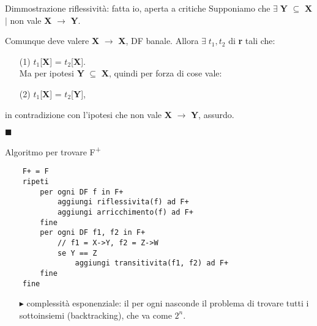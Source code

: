 \documentclass{beamer}
\begin{document}
\begin{frame}{Dimmostrazione riflessività: fatta io, aperta a critiche}
    Supponiamo che $\exists \;$\textbf{Y} $\subseteq$ \textbf{X} $|$ non vale \textbf{X} $\rightarrow$ \textbf{Y}.\par 
    Comunque deve valere \textbf{X} $\rightarrow$ \textbf{X}, DF banale. Allora $\exists \; t_1, t_2$ di \textbf{r} tali che:
    \begin{enumerate}
        \item[(1)] $t_1$[\textbf{X}] = $t_2$[\textbf{X}]. \\
        Ma per ipotesi \textbf{Y} $\subseteq$ \textbf{X}, quindi per forza di cose vale:
        \item[(2)] $t_1$[\textbf{X}] = $t_2$[\textbf{Y}],
    \end{enumerate}
    in contradizione con l'ipotesi che non vale \textbf{X} $\rightarrow$ \textbf{Y}, assurdo.\par
    \raggedleft
    \huge
    $\blacksquare$\hspace{1cm}
\end{frame}

\begin{frame}[fragile]{Algoritmo per trovare F\textsuperscript{+}}
    \begin{verbatim}
    F+ = F
    ripeti
        per ogni DF f in F+
            aggiungi riflessivita(f) ad F+
            aggiungi arricchimento(f) ad F+
        fine
        per ogni DF f1, f2 in F+
            // f1 = X->Y, f2 = Z->W
            se Y == Z
                aggiungi transitivita(f1, f2) ad F+
        fine
    fine
        \end{verbatim}
    \begin{itemize}
        \item[$\blacktriangleright$] complessità esponenziale: il per ogni nasconde il problema di trovare tutti i sottoinsiemi (backtracking), che va come $2^n$.
    \end{itemize}
\end{frame}


    
    
\end{document}
